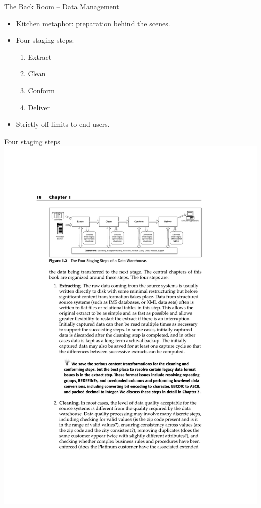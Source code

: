 \documentclass[aspectratio=169]{beamer}
\begin{document}
\begin{frame}{The Back Room – Data Management}
    \begin{itemize}
        \item Kitchen metaphor: preparation behind the scenes.
        \item Four staging steps:
        \begin{enumerate}
            \item Extract
            \item Clean
            \item Conform
            \item Deliver
        \end{enumerate}
        \item Strictly off-limits to end users.
    \end{itemize}
\end{frame}

\begin{frame}{Four staging steps}
    \centering
    \includegraphics[width=\textwidth, trim={3.5cm 20cm 4.5cm 5cm}, clip]{figures/staging_steps}
\end{frame}
\end{document}
